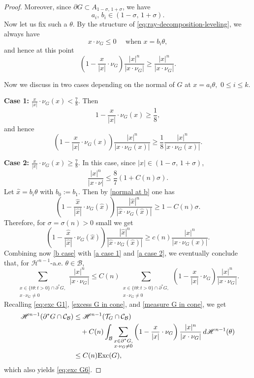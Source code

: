 \documentclass[reqno,11pt]{amsart}
\def\sz{\sigma}
\numberwithin{equation}{section}
\theoremstyle{remark}
\begin{document}
\begin{proof}
Moreover, since $\partial G\subset A_{1-\sz,\,1+\sz}$, we have
$$a_i,\,b_i\in (1-\sz,\,1+\sz).$$
Now let us fix such a $\theta$. By the structure of \eqref{eq:ray-decomposition-leveling}, we always have 
\begin{equation}\label{normal at b}
    x\cdot \nu_G\leq 0 \quad \text{ when $x=b_i\theta$},
\end{equation} 
and hence at this point
\begin{equation}\label{b case}
\left(1- \frac{x}{|x|}\cdot \nu_{G } \right)\frac{|x|^{n}}{ |x \cdot \nu_{G }|}\ge  \frac{|x|^{n}}{ |x \cdot \nu_{G }|}.
\end{equation}

Now we 
discuss in two cases depending on the normal of $G$ at $x=a_i\theta,$ $ 0\le i\le k$. 

{\noindent \bf Case 1: }  $\frac{x}{|x|}\cdot \nu_G(x)<\frac 7 8.$
Then 
$$ 1- \frac{x}{|x|}\cdot \nu_{G }(x) \ge \frac 1 8,$$
and hence
\begin{equation}\label{a case 1}
    \left(1- \frac{x}{|x|}\cdot \nu_{G }(x) \right)\frac{|x|^{n}}{ |x \cdot \nu_{G }(x)|}\ge \frac 1 8 \frac{|x|^{n}}{ |x \cdot \nu_{G }(x)|}.
\end{equation} 

{\noindent \bf Case 2:}  $\frac{x}{|x|}\cdot \nu_G(x)\ge \frac 7 8.$ 
In this case, since $|x|\in (1-\sz,\,1+\sz)$, 
$$\frac{|x|^n}{|x\cdot \nu|}\le \frac 8 7(1+C(n)\sz). $$
Let $\hat x = b_i \theta$ with $b_0:=b_1.$ Then by \eqref{normal at b} one has
$$\left(1- \frac{\hat x}{|\hat x|}\cdot \nu_{G }(\hat x) \right)\frac{|\hat x|^{n}}{ |\hat x \cdot \nu_{G }(\hat x)|}\ge 1-C(n)\sz.$$
Therefore, for $\sz=\sz(n)>0$ small we get
\begin{equation}\label{a case 2}
    \left(1- \frac{\hat x}{|\hat x|}\cdot \nu_{G }(\hat x) \right)\frac{|\hat x|^{n}}{ |\hat x \cdot \nu_{G }(\hat x)|}\ge c(n) \frac{|x|^n}{|x\cdot \nu_G(x)|}. 
\end{equation}
Combining now \eqref{b case} with \eqref{a case 1} and \eqref{a case 2}, we eventually conclude that, for  $\mathscr H^{n-1}$-a.e. $\theta \in \mathcal B$, 
$$
\sum_{\substack{x\in \{t\theta\colon t>0\}\cap \partial^* G,\\ x\cdot\nu_G\neq0}}\frac{|x|^{n}}{ |x \cdot \nu_{G }|}  \le C(n)   \sum_{\substack{x\in \{t\theta\colon t>0\}\cap \partial^* G,\\ x\cdot\nu_G\neq0}} \left(1- \frac{x}{|x|}\cdot \nu_{G } \right)\frac{|x|^{n}}{ |x \cdot \nu_{G }|}.
$$
Recalling \eqref{eq:exc G1}, \eqref{excess G in cone}, and
\eqref{measure G in cone}, we get
\begin{align}
\label{eq:exc G3}
     \mathscr H^{n-1}(\partial^* G\cap \mathcal C_{\mathcal B})
     &\le
     \mathscr H^{n-1}(\mathcal T_G\cap \mathcal C_{\mathcal B})  \notag\\
     &\quad+C(n)   \int_{\mathcal B } \sum_{\substack{x\in \partial^*G,\\ x\cdot \nu_{G }\neq 0}} \left(1- \frac{x}{|x|}\cdot \nu_{G } \right)\frac{|x|^{n}}{ |x \cdot \nu_{G }|}\, d\mathscr H^{n-1}(\theta) \notag\\
     &\le C(n) {\rm Exc}(G ),
\end{align}
which also yields \eqref{eq:exc G6}. 


\end{proof}
\end{document}
